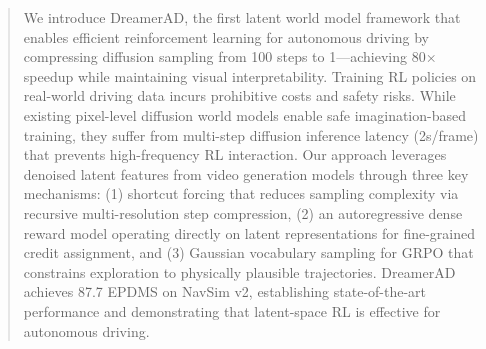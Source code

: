 \documentclass[runningheads]{llncs}
\begin{document}
\maketitle
{\let\thefootnote\relax{}}
\begin{abstract}
We introduce DreamerAD, the first latent world model framework that enables efficient reinforcement learning for autonomous driving by compressing diffusion sampling from 100 steps to 1—achieving 80× speedup while maintaining visual interpretability.
Training RL policies on real-world driving data incurs prohibitive costs and safety risks. While existing pixel-level diffusion world models enable safe imagination-based training, they suffer from multi-step diffusion inference latency (2s/frame) that prevents high-frequency RL interaction.
Our approach leverages denoised latent features from video generation models through three key mechanisms: (1) shortcut forcing that reduces sampling complexity via recursive multi-resolution step compression, (2) an autoregressive dense reward model operating directly on latent representations for fine-grained credit assignment, and (3) Gaussian vocabulary sampling for GRPO that constrains exploration to physically plausible trajectories.
DreamerAD achieves 87.7 EPDMS on NavSim v2, establishing state-of-the-art performance and demonstrating that latent-space RL is effective for autonomous driving.


\end{abstract}
\end{document}
